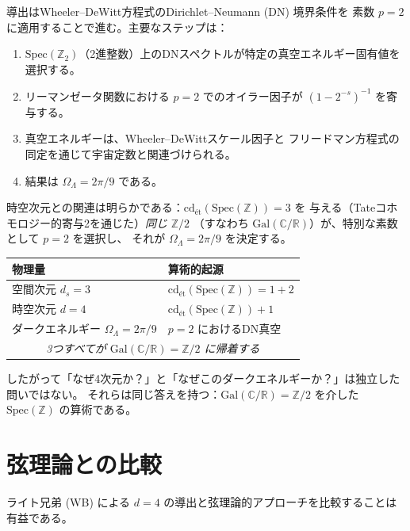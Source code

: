 \documentclass[12pt,a4paper]{article}
\theoremstyle{definition}
\newcommand{\Spec}{\mathrm{Spec}}
\newcommand{\Gal}{\mathrm{Gal}}
\newcommand{\cd}{\mathrm{cd}}
\newcommand{\ZZ}{\mathbb{Z}}
\newcommand{\RR}{\mathbb{R}}
\newcommand{\CC}{\mathbb{C}}
\begin{document}
導出はWheeler--DeWitt方程式のDirichlet--Neumann (DN) 境界条件を
素数 $p=2$ に適用することで進む。主要なステップは：

\begin{enumerate}
  \item $\Spec(\ZZ_2)$（2進整数）上のDNスペクトルが特定の真空エネルギー固有値を選択する。
  \item リーマンゼータ関数における $p=2$ でのオイラー因子が
    $(1 - 2^{-s})^{-1}$ を寄与する。
  \item 真空エネルギーは、Wheeler--DeWittスケール因子と
    フリードマン方程式の同定を通じて宇宙定数と関連づけられる。
  \item 結果は $\Omega_\Lambda = 2\pi/9$ である。
\end{enumerate}

時空次元との関連は明らかである：$\cd_{\text{\'et}}(\Spec(\ZZ)) = 3$ を
与える（Tateコホモロジー的寄与2を通じた）\emph{同じ} $\ZZ/2$
（すなわち $\Gal(\CC/\RR)$）が、特別な素数として $p=2$ を選択し、
それが $\Omega_\Lambda = 2\pi/9$ を決定する。

\begin{center}
\begin{tabular}{ll}
\toprule
\textbf{物理量} & \textbf{算術的起源} \\
\midrule
空間次元 $d_s = 3$ & $\cd_{\text{\'et}}(\Spec(\ZZ)) = 1 + 2$ \\
時空次元 $d = 4$ & $\cd_{\text{\'et}}(\Spec(\ZZ)) + 1$ \\
ダークエネルギー $\Omega_\Lambda = 2\pi/9$ & $p=2$ におけるDN真空 \\
\midrule
\multicolumn{2}{c}{\textit{3つすべてが $\Gal(\CC/\RR) = \ZZ/2$ に帰着する}} \\
\bottomrule
\end{tabular}
\end{center}

したがって「なぜ4次元か？」と「なぜこのダークエネルギーか？」は独立した問いではない。
それらは同じ答えを持つ：$\Gal(\CC/\RR) = \ZZ/2$ を介した $\Spec(\ZZ)$ の算術である。

\section{弦理論との比較}\label{sec:comparison}

ライト兄弟 (WB) による $d=4$ の導出と弦理論的アプローチを比較することは有益である。
\end{document}
